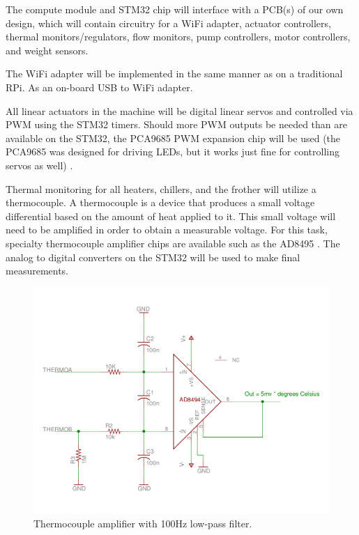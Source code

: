 \documentclass[conference]{IEEEtran}
\begin{document}
The compute module and STM32 chip will interface with a PCB(s) of our own
design, which will contain circuitry for a WiFi adapter, actuator controllers, thermal
monitors/regulators, flow monitors, pump controllers, motor controllers, and
weight sensors.

The WiFi adapter will be implemented in the same manner as on a traditional RPi.
As an on-board USB to WiFi adapter.

All linear actuators in the machine will be digital linear servos and controlled
via PWM using the STM32 timers. Should more PWM outputs be needed than are
available on the STM32, the PCA9685 PWM expansion chip will be used (the
PCA9685 was designed for driving LEDs, but it works just fine for controlling
servos as well) \cite{PWM}.

Thermal monitoring for all heaters, chillers, and the frother will utilize a
thermocouple. A thermocouple is a device that produces a small voltage
differential based on the amount of heat applied to it. This small voltage will
need to be amplified in order to obtain a measurable voltage. For this task,
specialty thermocouple amplifier chips are available such as the AD8495
\cite{thermo}.
The analog to digital converters on the STM32 will be used to make final measurements.

\begin{figure}
  \centering
    \includegraphics[width=1.8\columnwidth]{ThermoAmp}
    \caption{Thermocouple amplifier with 100Hz low-pass filter.}
\end{figure}
\end{document}
